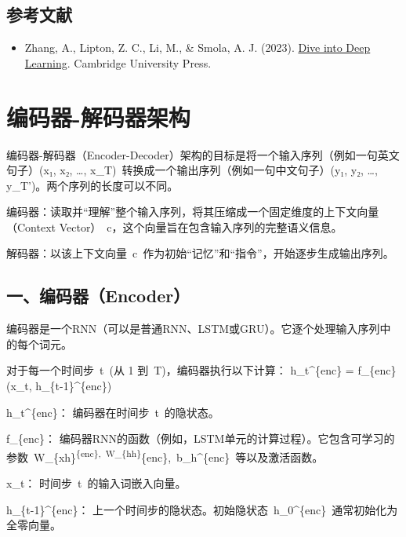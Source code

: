 \hypertarget{ux53c2ux8003ux6587ux732e-18}{%
\subsection{参考文献}\label{ux53c2ux8003ux6587ux732e-18}}

\vspace{0.25em}
\begin{itemize}
\tightlist
\item
  Zhang, A., Lipton, Z. C., Li, M., \& Smola, A. J. (2023). \href{https://D2L.ai}{Dive into Deep Learning}. Cambridge University Press.
\end{itemize}

\clearpage

\hypertarget{ux7f16ux7801ux5668-ux89e3ux7801ux5668ux67b6ux6784}{%
\section{编码器-解码器架构}\label{ux7f16ux7801ux5668-ux89e3ux7801ux5668ux67b6ux6784}}

编码器-解码器（Encoder-Decoder）架构的目标是将一个输入序列（例如一句英文句子）(x₁, x₂, \ldots, x\_T)~转换成一个输出序列（例如一句中文句子）(y₁, y₂, \ldots, y\_T')。两个序列的长度可以不同。

编码器：读取并``理解''整个输入序列，将其压缩成一个固定维度的上下文向量（Context Vector）~c，这个向量旨在包含输入序列的完整语义信息。

解码器：以该上下文向量~c~作为初始``记忆''和``指令''，开始逐步生成输出序列。

\hypertarget{ux4e00ux7f16ux7801ux5668encoder}{%
\subsection{一、编码器（Encoder）}\label{ux4e00ux7f16ux7801ux5668encoder}}

编码器是一个RNN（可以是普通RNN、LSTM或GRU）。它逐个处理输入序列中的每个词元。

对于每一个时间步~t~(从 1 到~T)，编码器执行以下计算：
h\_t\^{}\{enc\} = f\_\{enc\}(x\_t, h\_\{t-1\}\^{}\{enc\})

h\_t\^{}\{enc\}： 编码器在时间步~t~的隐状态。

f\_\{enc\}： 编码器RNN的函数（例如，LSTM单元的计算过程）。它包含可学习的参数~W\_\{xh\}\textsuperscript{\{enc\},~W\_\{hh\}}\{enc\},~b\_h\^{}\{enc\}~等以及激活函数。

x\_t： 时间步~t~的输入词嵌入向量。

h\_\{t-1\}\^{}\{enc\}： 上一个时间步的隐状态。初始隐状态~h\_0\^{}\{enc\}~通常初始化为全零向量。

